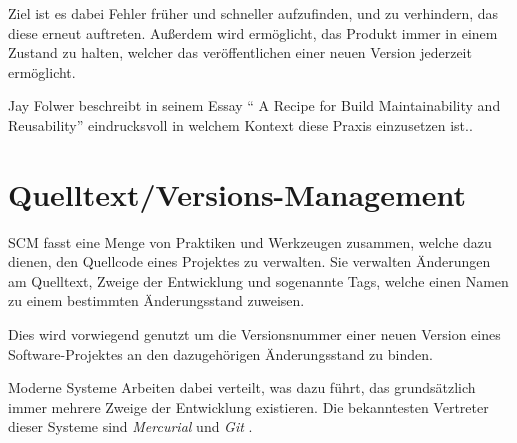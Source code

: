 Ziel ist es dabei Fehler früher und schneller aufzufinden,
und zu verhindern, das diese erneut auftreten.
Außerdem wird ermöglicht, das Produkt immer in einem Zustand zu halten,
welcher das veröffentlichen einer neuen Version jederzeit ermöglicht.

Jay Folwer beschreibt in seinem Essay ``
A Recipe for Build Maintainability and Reusability'' \cite{folwer:receipe} eindrucksvoll in welchem Kontext diese Praxis einzusetzen ist..


\section{Quelltext/Versions-Management}
\label{sec:base:scm}


\ac{SCM} fasst eine Menge
von Praktiken und Werkzeugen zusammen,
welche dazu dienen, den Quellcode eines Projektes zu verwalten.
Sie verwalten Änderungen am Quelltext, Zweige der Entwicklung und sogenannte Tags,
welche einen Namen zu einem bestimmten Änderungsstand zuweisen.

Dies wird vorwiegend genutzt um die Versionsnummer einer neuen Version eines Software-Projektes an den dazugehörigen Änderungsstand zu binden.

Moderne Systeme Arbeiten dabei verteilt,
was dazu führt, das grundsätzlich immer mehrere Zweige der Entwicklung existieren.
Die bekanntesten Vertreter dieser Systeme sind \emph{Mercurial} \cite{mercurial:website}
und \emph{Git} \cite{git:website}.

